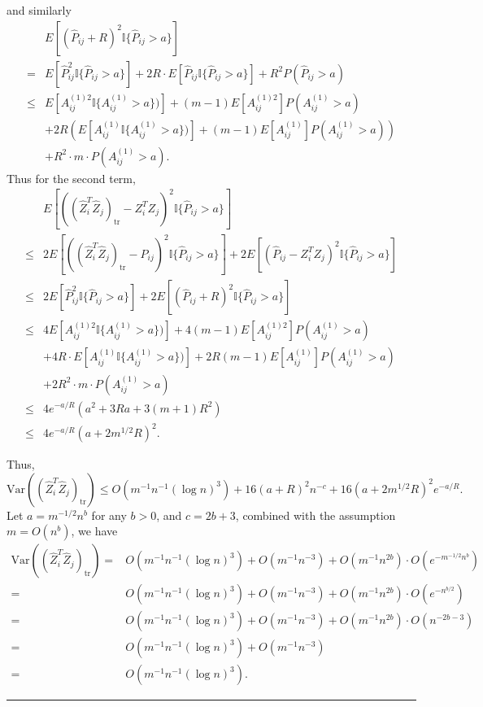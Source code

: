 \documentclass[a4paper]{article}
\newenvironment{proof}{{\bf Proof:  }}{\hfill\rule{2mm}{2mm}}
\renewcommand{\hat}{\widehat}
\begin{document}
\begin{proof}
and similarly
\begin{align*}
	& E[(\hat{P}_{ij} + R)^2 \mathbb{I} \{ \hat{P}_{ij} > a \}] \\
	= & E[\hat{P}_{ij}^2 \mathbb{I} \{ \hat{P}_{ij} > a \}] + 2R \cdot E[\hat{P}_{ij} \mathbb{I} \{ \hat{P}_{ij} > a \}] + R^2 P(\hat{P}_{ij} > a) \\
	\le & E[A_{ij}^{(1)2} \mathbb{I} \{ A_{ij}^{(1)} > a \})] + (m-1) E[A_{ij}^{(1)2}] P(A_{ij}^{(1)} > a) \\
	& + 2R \left( E[A_{ij}^{(1)} \mathbb{I} \{ A_{ij}^{(1)} > a \})] + (m-1) E[A_{ij}^{(1)}] P(A_{ij}^{(1)} > a) \right) \\
	& + R^2 \cdot m \cdot P(A_{ij}^{(1)} > a).
\end{align*}
Thus for the second term,
\begin{align*}
	& E[((\hat{Z}_i^T \hat{Z}_j)_{\mathrm{tr}} - Z_i^T Z_j)^2 \mathbb{I}\{\hat{P}_{ij} > a\}] \\
	\le & 2 E[((\hat{Z}_i^T \hat{Z}_j)_{\mathrm{tr}} - \hat{P}_{ij})^2 \mathbb{I}\{\hat{P}_{ij} > a\}] + 2 E[(\hat{P}_{ij} - Z_i^T Z_j)^2 \mathbb{I}\{\hat{P}_{ij} > a\}] \\
	\le & 2 E[\hat{P}_{ij}^2 \mathbb{I}\{\hat{P}_{ij} > a\}] + 2 E[(\hat{P}_{ij} + R)^2 \mathbb{I}\{\hat{P}_{ij} > a\}] \\
	\le & 4 E[A_{ij}^{(1)2} \mathbb{I} \{ A_{ij}^{(1)} > a \})] + 4(m-1) E[A_{ij}^{(1)2}] P(A_{ij}^{(1)} > a) \\
	& + 4R \cdot E[A_{ij}^{(1)} \mathbb{I} \{ A_{ij}^{(1)} > a \})] + 2R(m-1) E[A_{ij}^{(1)}] P(A_{ij}^{(1)} > a) \\
	& + 2R^2 \cdot m \cdot P(A_{ij}^{(1)} > a) \\
	\le & 4 e^{-a/R} \left( a^2 + 3R a + 3(m+1)R^2 \right) \\
	\le & 4 e^{-a/R} (a + 2 m^{1/2} R)^2.
\end{align*}

Thus,
\[
	\mathrm{Var}((\hat{Z}_i^T \hat{Z}_j)_{\mathrm{tr}}) \le
	O(m^{-1} n^{-1} (\log n)^3) + 16 (a+R)^2 n^{-c} + 16 (a+2 m^{1/2} R)^2 e^{-a/R}.
\]
Let $a = m^{-1/2} n^{b}$ for any $b > 0$, and $c = 2b + 3$, combined with the assumption $m = O(n^{b})$, we have
\begin{align*}
	\mathrm{Var}((\hat{Z}_i^T \hat{Z}_j)_{\mathrm{tr}})
	= & O(m^{-1} n^{-1} (\log n)^3) + O(m^{-1} n^{-3}) + O(m^{-1} n^{2b}) \cdot O(e^{-m^{-1/2} n^{b}}) \\
	= & O(m^{-1} n^{-1} (\log n)^3) + O(m^{-1} n^{-3}) + O(m^{-1} n^{2b}) \cdot O(e^{- n^{b/2}}) \\
	= & O(m^{-1} n^{-1} (\log n)^3) + O(m^{-1} n^{-3}) + O(m^{-1} n^{2b}) \cdot O(n^{-2b-3}) \\
	= & O(m^{-1} n^{-1} (\log n)^3) + O(m^{-1} n^{-3}) \\
	= & O(m^{-1} n^{-1} (\log n)^3).
\end{align*}
\end{proof}
\end{document}
